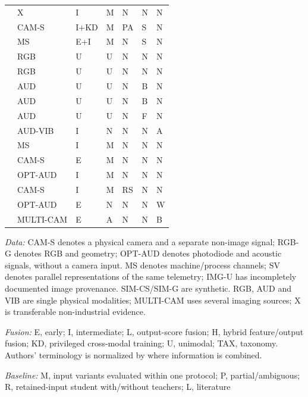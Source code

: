 \begin{longtable}{@{}p{}llllll@{}}
\citep{Wang2020What} & X & I & M & N & N & N \\
\citep{Xie2025Audiovisual} & CAM-S & I+KD & M & PA & S & N \\
\citep{Goodarzi2023Deep} & MS & E+I & M & N & S & N \\
\citep{Roth2022Towards} & RGB & U & U & N & N & N \\
\citep{Bergmann2019MVTec} & RGB & U & U & N & N & N \\
\citep{Purohit2019MIMII} & AUD & U & U & N & B & N \\
\citep{Koizumi2019ToyADMOS} & AUD & U & U & N & B & N \\
\citep{Koizumi2020Description} & AUD & U & U & N & F & N \\
\citep{Chu2024A} & AUD-VIB & I & N & N & N & A \\
\citep{Kullu2022A} & MS & I & M & N & N & N \\
\citep{Chen2023Multisensor} & CAM-S & E & M & N & N & N \\
\citep{Li2022A} & OPT-AUD & I & M & N & N & N \\
\citep{Petrich2021Multimodal} & CAM-S & I & M & RS & N & N \\
\citep{Pandiyan2022Deep} & OPT-AUD & E & N & N & N & W \\
\citep{Bevans2023Heterogeneous} & MULTI-CAM & E & A & N & N & B \\
\bottomrule
\end{longtable}
\noindent\textit{Data:} CAM-S denotes a physical camera and a separate non-image signal;
RGB-G denotes RGB and geometry; OPT-AUD denotes photodiode and acoustic signals, without
a camera input. MS denotes machine/process channels; SV denotes parallel representations
of the same telemetry; IMG-U has incompletely documented image provenance. SIM-CS/SIM-G
are synthetic. RGB, AUD and VIB are single physical modalities; MULTI-CAM uses several
imaging sources; X is transferable non-industrial evidence.
\par\noindent\textit{Fusion:} E, early; I, intermediate; L, output-score fusion; H,
hybrid feature/output fusion; KD, privileged cross-modal training; U, unimodal; TAX,
taxonomy. Authors' terminology is normalized by where information is combined.
\par\noindent\textit{Baseline:} M, input variants evaluated within one protocol; P,
partial/ambiguous; R, retained-input student with/without teachers; L, literature
